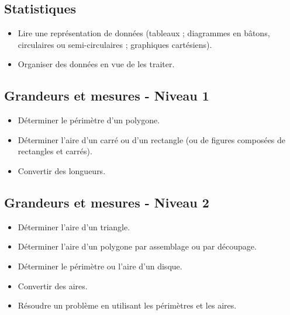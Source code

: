 \documentclass[a4paper,12pt,fleqn]{article}
\begin{document}
\subsection*{Statistiques}

\begin{itemize}[itemsep=1em]
	\item {}Lire une représentation de données (tableaux ; diagrammes en bâtons, circulaires ou semi-circulaires ; graphiques cartésiens).
	\item {}Organiser des données en vue de les traiter.
\end{itemize}

\newpage


\subsection*{Grandeurs et mesures - Niveau 1}

\begin{itemize}[itemsep=1em]
	\item {}Déterminer le périmètre d’un polygone.
	\item {}Déterminer l’aire d’un carré ou d’un rectangle (ou de figures composées de rectangles et carrés).
	\item {}Convertir des longueurs.
\end{itemize}

\subsection*{Grandeurs et mesures - Niveau 2}

\begin{itemize}[itemsep=1em]
	\item {}Déterminer l’aire d’un triangle.
	\item {}Déterminer l’aire d’un polygone par assemblage ou par découpage.
	\item {}Déterminer le périmètre ou l’aire d’un disque.
	\item {}Convertir des aires.
	\item {}Résoudre un problème en utilisant les périmètres et les aires.


\end{itemize}
\end{document}
